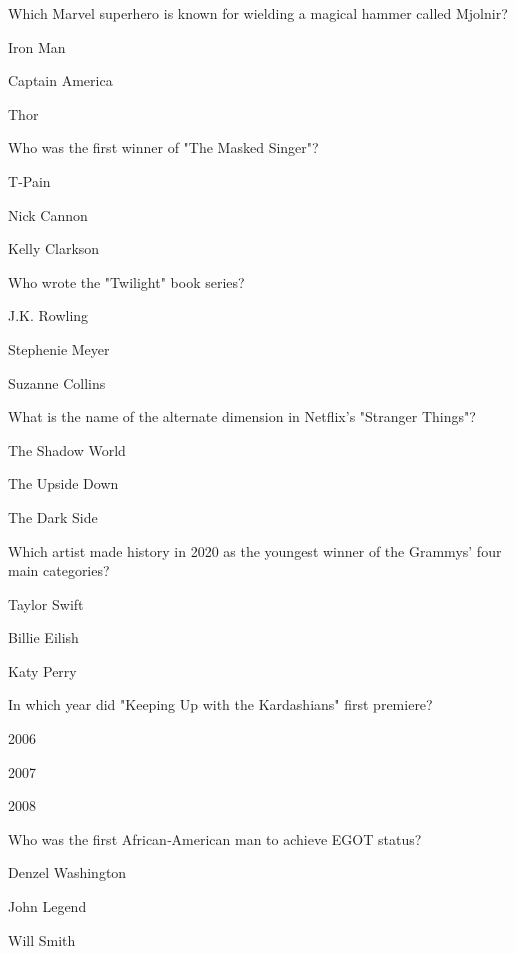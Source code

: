 
\begin{enhancedmcq}{Which Marvel superhero is known for wielding a magical hammer called Mjolnir?}
\item Iron Man
\item Captain America
\item Thor

\end{enhancedmcq}
\begin{enhancedmcq}{Who was the first winner of "The Masked Singer"?}
\item T‑Pain
\item Nick Cannon
\item Kelly Clarkson

\end{enhancedmcq}
\begin{enhancedmcq}{Who wrote the "Twilight" book series?}
\item J.K. Rowling
\item Stephenie Meyer
\item Suzanne Collins

\end{enhancedmcq}
\begin{enhancedmcq}{What is the name of the alternate dimension in Netflix's "Stranger Things"?}
\item The Shadow World
\item The Upside Down
\item The Dark Side

\end{enhancedmcq}
\begin{enhancedmcq}{Which artist made history in 2020 as the youngest winner of the Grammys' four main categories?}
\item Taylor Swift
\item Billie Eilish
\item Katy Perry

\end{enhancedmcq}
\begin{enhancedmcq}{In which year did "Keeping Up with the Kardashians" first premiere?}
\item 2006
\item 2007
\item 2008

\end{enhancedmcq}
\begin{enhancedmcq}{Who was the first African‑American man to achieve EGOT status?}
\item Denzel Washington
\item John Legend
\item Will Smith

\end{enhancedmcq}

